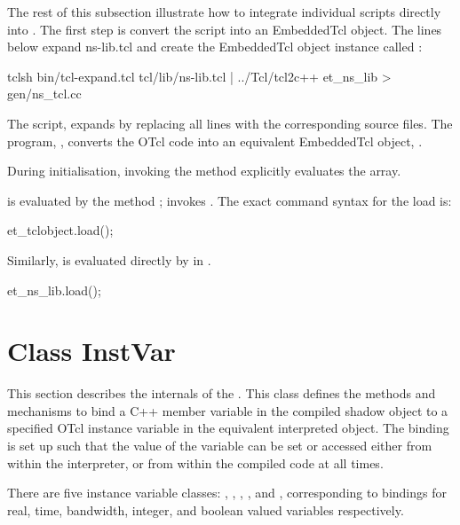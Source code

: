 The rest of this subsection illustrate
how to integrate individual scripts directly into \ns.
The first step is convert the script into an EmbeddedTcl object.
The lines below expand ns-lib.tcl and create the EmbeddedTcl object
instance called :
\begin{program}
        tclsh bin/tcl-expand.tcl tcl/lib/ns-lib.tcl | \bs
                               ../Tcl/tcl2c++ et_ns_lib > gen/ns_tcl.cc
\end{program}
The script, 
expands  by replacing all  lines
with the corresponding source files.
The program, ,
converts the OTcl code into an equivalent EmbeddedTcl object, .

During initialisation, invoking the method 
explicitly evaluates the array.
\begin{list}{---}{}
\item
  is evaluated by the method
  ;
  invokes .
  The exact command syntax for the load is:
  \begin{program}
	et_tclobject.load();
  \end{program}
\item
  Similarly,
  is evaluated directly by  in .
  \begin{program}
	et_ns_lib.load();
  \end{program}
\end{list}

\section{Class InstVar}
\label{sec:InstVar}

This section describes the internals of the .
This class defines the methods and mechanisms to bind
a C++ member variable in the compiled shadow object
to a specified OTcl instance variable in the equivalent interpreted object.
The binding is set up such that the value of the variable can be
set or accessed either from within the interpreter, or from
within the compiled code at all times.

There are five instance variable classes:
,
,
,
,
and ,
corresponding to bindings for real, time, bandwidth, integer, and
boolean valued variables respectively.

